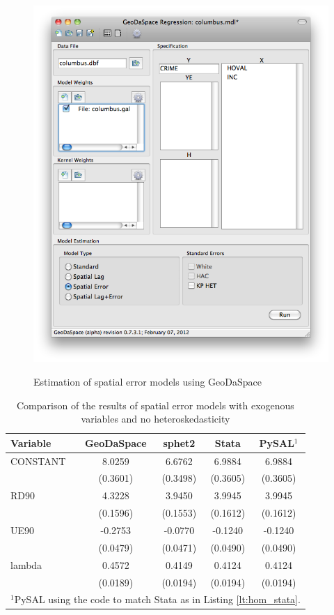 \documentclass{article}
\begin{document}
\begin{figure}[htb]
\caption{Estimation of spatial error models using GeoDaSpace}
\label{f:GS_hom}
\begin{center}
\includegraphics[width=0.7\linewidth]{GS_hom.png}\\
\end{center}
\end{figure}

\begin{table}[htpb]
\caption{Comparison of the results of spatial error models with exogenous variables and no heteroskedasticity}
\label{t:res_hom}
\centering
\begin{small}
\begin{tabular}{l|cccc} \hline
\textbf{Variable}&\textbf{GeoDaSpace}&\textbf{sphet2}&\textbf{Stata}&\textbf{PySAL$^1$}\\ \hline
CONSTANT&8.0259&6.6762&6.9884&6.9884\\
&(0.3601)&(0.3498)&(0.3605)&(0.3605)\\
RD90&4.3228&3.9450&3.9945&3.9945\\
&(0.1596)&(0.1553)&(0.1612)&(0.1612)\\
UE90&-0.2753&-0.0770&-0.1240&-0.1240\\
&(0.0479)&(0.0471)&(0.0490)&(0.0490)\\
lambda&0.4572&0.4149&0.4124&0.4124\\
&(0.0189)&(0.0194)&(0.0194)&(0.0194)\\
\hline
\multicolumn{5}{l}{\scriptsize{$^1$PySAL using the code to match Stata as in Listing \ref{lt:hom_stata}.}} \\
\end{tabular}
\end{small}
\end{table}
\end{document}
